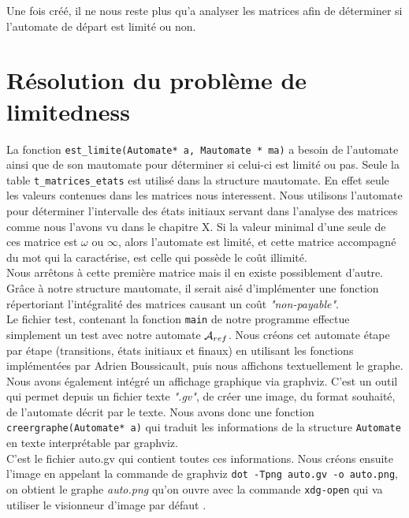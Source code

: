 \documentclass{report}
\begin{document}
Une fois créé, il ne nous reste plus qu'a analyser les matrices afin de déterminer si l'automate de départ est limité ou non.\\

\chapter{Résolution du problème de limitedness}

La fonction \verb?est_limite(Automate* a, Mautomate * ma)? a besoin de l'automate ainsi que de son mautomate pour déterminer si celui-ci est limité ou pas. Seule la table \verb?t_matrices_etats? est utilisé dans la structure mautomate. En effet seule les valeurs contenues dans les matrices nous interessent. Nous utilisons l'automate pour déterminer l'intervalle des états initiaux servant dans l'analyse des matrices comme nous l'avons vu dans le chapitre X. Si la valeur minimal d'une seule de ces matrice est $\omega$ ou $\infty$, alors l'automate est limité, et cette matrice accompagné du mot qui la caractérise, est celle qui possède le coût illimité.\\
Nous arrêtons à cette première matrice mais il en existe possiblement d'autre. Grâce à notre structure mautomate, il serait aisé d'implémenter une fonction répertoriant l'intégralité des matrices causant un coût \textit{"non-payable"}.\\

Le fichier test, contenant la fonction \verb?main? de notre programme effectue simplement un test avec notre automate $\mathcal{A}_{ref}$. Nous créons cet automate étape par étape (transitions, états initiaux et finaux) en utilisant les fonctions implémentées par Adrien Boussicault, puis nous affichons textuellement le graphe. \\

Nous avons également intégré un affichage graphique via graphviz. C'est un outil qui permet depuis un fichier texte \textit{".gv"}, de créer une image, du format souhaité, de l'automate décrit par le texte. Nous avons donc une fonction \verb?creergraphe(Automate* a)? qui traduit les informations de la structure \verb?Automate? en texte interprétable par graphviz.\\
C'est le fichier auto.gv qui contient toutes ces informations. Nous créons ensuite l'image en appelant la commande de graphviz  \verb?dot -Tpng auto.gv -o auto.png?, on obtient le graphe \textit{auto.png} qu'on ouvre avec la commande \verb?xdg-open? qui va utiliser le visionneur d'image par défaut .\\
\end{document}
